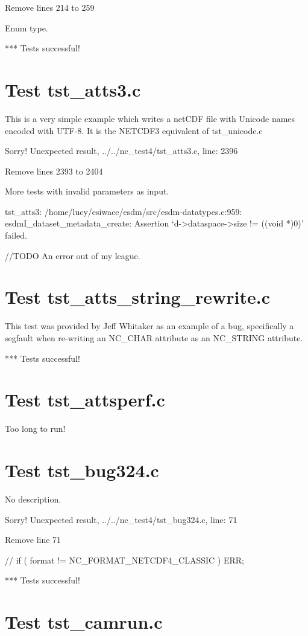 Remove lines 214 to 259

Enum type.

*** Tests successful!

\section{Test tst\_atts3.c}

This is a very simple example which writes a netCDF file with
Unicode names encoded with UTF-8. It is the NETCDF3 equivalent
of tst\_unicode.c

Sorry! Unexpected result, ../../nc\_test4/tst\_atts3.c, line: 2396

Remove lines 2393 to 2404

More tests with invalid parameters as input.

tst\_atts3: /home/lucy/esiwace/esdm/src/esdm-datatypes.c:959: esdmI\_dataset\_metadata\_create: Assertion `d->dataspace->size != ((void *)0)' failed.

//TODO An error out of my league.

\section{Test tst\_atts\_string\_rewrite.c}

This test was provided by Jeff Whitaker as an example of a bug,
specifically a segfault when re-writing an NC\_CHAR attribute as
an NC\_STRING attribute.

*** Tests successful!

\section{Test tst\_attsperf.c}

Too long to run!

\section{Test tst\_bug324.c}

No description.

Sorry! Unexpected result, ../../nc\_test4/tst\_bug324.c, line: 71

Remove line 71

// if ( format != NC\_FORMAT\_NETCDF4\_CLASSIC ) ERR;

*** Tests successful!

\section{Test tst\_camrun.c}

